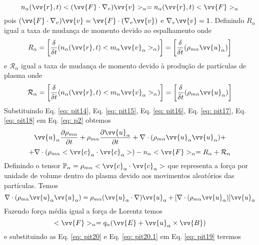 \documentclass[12pt,oneside,a4paper]{abntex2}
\theoremstyle{definition}  %
\begin{document}
\begin{equation}
\label{eq: pit16}
n_\alpha(\vv{r},t) <(\vv{F} \cdot \nabla_v)\vv{v}>_\alpha=n_\alpha(\vv{r},t)<\vv{F}>_\alpha
\end{equation}
pois $(\vv{F} \cdot \nabla_v)\vv{v} = \vv{F} \cdot (\nabla_v\vv{v})$ e $\nabla_v\vv{v} = 1$. Definindo $R_\alpha$ igual a taxa de mudança de momento devido ao espalhamento onde
\begin{equation}
\label{eq: pit17}
R_\alpha = \left[\frac{\delta}{\delta t}(n_\alpha(\vv{r},t)<m_\alpha \vv{v}_\alpha>_\alpha)\right]=\left[\frac{\delta}{\delta t}(\rho_{m\alpha}\vv{u}_\alpha)\right]
\end{equation}
e  $\mathcal{R}_\alpha$ igual a taxa de mudança de momento devido à produção de partículas de plasma onde
\begin{equation}
\label{eq: pit18}
\mathcal{R}_\alpha = \left[\frac{\delta}{\delta t}(n_\alpha(\vv{r},t)<m_\alpha \vv{v}_\alpha>_\alpha)\right] = \left[\frac{\delta}{\delta t}(\rho_{m\alpha}\vv{u}_\alpha)\right]
\end{equation}
Substituindo Eq. \ref{eq: pit14}, Eq. \ref{eq: pit15}, Eq. \ref{eq: pit16}, Eq. \ref{eq: pit17}, Eq. \ref{eq: pit18} em Eq. \ref{eq: p2} obtemos
\begin{equation}
\label{eq: pit19}
\vv{u}_\alpha \frac{\partial \rho_{m\alpha}}{\partial t} + \rho_{m\alpha} \frac{\partial \vv{u}_\alpha}{\partial t}+ \nabla \cdot (\rho_{m\alpha} \vv{u}_\alpha \vv{u}_\alpha)+
\end{equation} 
\begin{equation*}
+\nabla \cdot (\rho_{m\alpha} <\vv{c}_\alpha \cdot \vv{c}_\alpha>)-n_\alpha<\vv{F}>_\alpha=R_\alpha + \mathcal{R}_\alpha
\end{equation*}
Definindo o tensor $\mathbb{P}_\alpha=\rho_{m\alpha} <\vv{c}_\alpha \cdot \vv{c}_\alpha>$ que representa a força por unidade de volume dentro do plasma devido aos movimentos aleatórios das partículas. Temos
\begin{equation}
\label{eq: pit20}
\nabla \cdot (\rho_{m\alpha} \vv{u}_\alpha \vv{u}_\alpha) =  \rho_{m\alpha}(\vv{u}_\alpha \cdot \nabla)\vv{u}_\alpha + [\nabla \cdot (\rho_{m\alpha} \vv{u}_\alpha)]\vv{u}_\alpha
\end{equation}
Fazendo força média igual a força de Lorentz temos 
\begin{equation}
\label{eq: pit20.1}
<\vv{F}>_\alpha = q_\alpha (\vv{E} + \vv{u}_\alpha \times \vv{B})
\end{equation} e substituindo as Eq. \ref{eq: pit20} e Eq. \ref{eq: pit20.1} em Eq. \ref{eq: pit19} teremos
\end{document}
